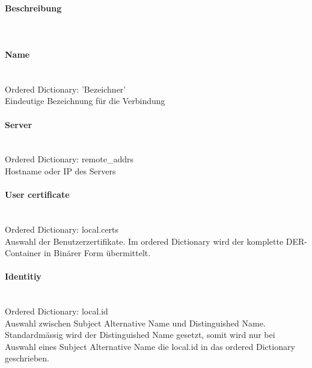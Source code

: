 \begin{minipage}[t]{0.5\textwidth}
\vspace{0pt}
\paragraph{Beschreibung}\mbox{}\\
\paragraph{Name}\label{name}\mbox{}\\
\hspace*{18pt}Ordered Dictionary: 'Bezeichner'\\
Eindeutige Bezeichnung für die Verbindung \\

\paragraph{Server}\label{server}\mbox{}\\
\hspace*{18pt}Ordered Dictionary: remote\_addrs\\
Hostname oder IP des Servers\\

\paragraph{User certificate}\label{usercertificate}\mbox{}\\
\hspace*{18pt}Ordered Dictionary: local.certs\\
Auswahl der Benutzerzertifikate. Im ordered Dictionary wird der komplette DER-Container in Binärer Form übermittelt.\\

\paragraph{Identitiy}\label{identitiy}\mbox{}\\
\hspace*{18pt}Ordered Dictionary: local.id\\
Auswahl zwischen Subject Alternative Name und Distinguished Name. Standardmässig wird der Distinguished Name gesetzt, somit wird nur bei Auswahl eines Subject Alternative Name die local.id in das ordered Dictionary geschrieben.\\


\end{minipage}
